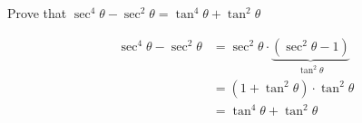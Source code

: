 

\question[1] Prove that $\sec^4\theta - \sec^2\theta = \tan^4\theta + \tan^2\theta$


\ifprintanswers
\fi

\begin{solution}[\mcq]
   \begin{align}
      \sec^4\theta - \sec^2\theta &= \sec^2\theta\cdot\underbrace{(\sec^2\theta - 1)}_{\tan^2\theta} \\
      &= (1+\tan^2\theta)\cdot\tan^2\theta \\
      &= \tan^4\theta + \tan^2\theta
   \end{align}
\end{solution}

